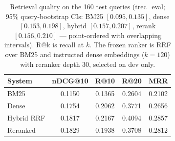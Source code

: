 \begin{table}[t]
\centering
\caption{Retrieval quality on the 160 test queries (trec\_eval; 95\% query-bootstrap CIs: BM25 $[0.095,0.135]$, dense $[0.153,0.198]$, hybrid $[0.157,0.207]$, rerank $[0.156,0.210]$ --- point-ordered with overlapping intervals). R@k is recall at $k$. The frozen ranker is RRF over BM25 and instructed dense embeddings ($k=120$) with reranker depth 30, selected on dev only.}
\label{tab:retrieval}
\begin{tabular}{lcccc}
\toprule
System & nDCG@10 & R@10 & R@20 & MRR \\
\midrule
BM25 & 0.1150 & 0.1365 & 0.2604 & 0.2102 \\
Dense & 0.1754 & 0.2062 & 0.3771 & 0.2656 \\
Hybrid RRF & 0.1817 & 0.2167 & 0.4094 & 0.2857 \\
Reranked & 0.1829 & 0.1938 & 0.3708 & 0.2812 \\
\bottomrule
\end{tabular}
\end{table}
